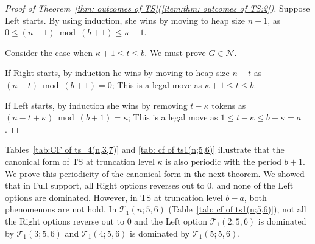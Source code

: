 \documentclass[oneside,reqno]{amsart}
\newcommand{\ts}{\mathcal{T}}
\newcommand{\lp}{\mathscr{L}}
\newcommand{\np}{\mathscr{N}}
\newcommand{\pp}{\mathscr{P}}
\begin{document}
\begin{proof}[Proof of Theorem~\ref{thm: outcomes of TS}(\ref{item:thm: outcomes of TS:2})]
    Suppose Left starts. By using induction, she wins by moving to heap size $n-1$, as $0\le (n-1) \bmod (b+1)\le {\kappa}-1$. %

    Consider the case when ${\kappa}+1\le t\le b$. We must prove $G\in \np$.
    
    If Right starts, by induction he wins by moving to heap size $n-t$ as $(n-t)\bmod (b+1)=0$; This is a legal move as ${\kappa}+1\le t\le b$.
    
    If Left starts, by induction she wins by removing $t-{\kappa}$ tokens as $(n-t+{\kappa})\bmod (b+1)={\kappa}$; This is a legal move as $1\le t-{\kappa}\le b-{\kappa}=a$.
\end{proof}


Tables~\ref{tab:CF of ts_4(n,3,7)} and \ref{tab: cf of ts1(n;5,6)} illustrate that the canonical form of {\sc TS} at truncation level $\kappa$ is also periodic with the period $b+1$. We prove this periodicity of the canonical form in the next theorem. We showed that in {\sc Full support}, all Right options reverses out to $0$, and none of the Left options are dominated. However, in {\sc TS} at truncation level $b-a$, both phenomenons are not hold.
In $\ts_1(n;5,6)$ (Table~\ref{tab: cf of ts1(n;5,6)}), not all the Right options reverse out to 0 and the Left option $\ts_1(2;5,6)$ is dominated by $\ts_1(3;5,6)$ and $\ts_1(4;5,6)$ is dominated by $\ts_1(5;5,6)$. 
\end{document}
